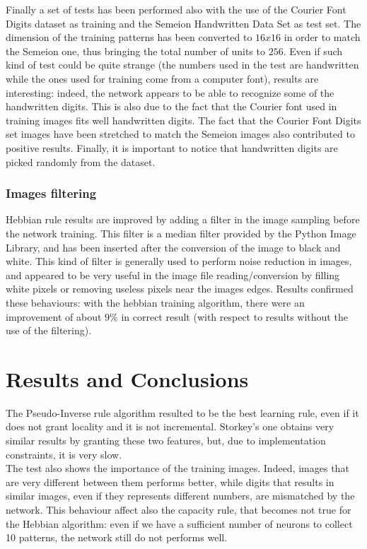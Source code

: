 \documentclass[letterpaper,twocolumn,10pt]{article}
\begin{document}
Finally a set of tests has been performed also with the use of the Courier Font Digits dataset as training and the Semeion Handwritten Data Set as test set. The dimension of the training patterns has been converted to $16x16$ in order to match the Semeion one, thus bringing the total number of units to $256$. Even if such kind of test could be quite strange (the numbers used in the test are handwritten while the ones used for training come from a computer font), results are interesting: indeed, the network appears to be able to recognize some of the handwritten digits. This is also due to the fact that the Courier font used in training images fits well handwritten digits. The fact that the Courier Font Digits set images have been stretched to match the Semeion images also contributed to positive results. Finally, it is important to notice that handwritten digits are picked randomly from the dataset.\\

\subsubsection{Images filtering}
Hebbian rule results are improved by adding a filter in the image sampling before the network training. This filter is a median filter provided by the Python Image Library, and has been inserted after the conversion of the image to black and white. This kind of filter is generally used to perform noise reduction in images, and appeared to be very useful in the image file reading/conversion by filling white pixels or removing useless pixels near the images edges. Results confirmed these behaviours: with the hebbian training algorithm, there were an improvement of about $9\%$ in correct result (with respect to results without the use of the filtering).



\section{Results and Conclusions}
The Pseudo-Inverse rule algorithm resulted to be the best learning rule, even if it does not grant locality and it is not incremental. Storkey's one obtains very similar results by granting these two features, but, due to implementation constraints, it is very slow.\\
The test also shows the importance of the training images. Indeed, images that are very different between them performs better, while digits that results in similar images, even if they represents different numbers, are mismatched by the network. This behaviour affect also the capacity rule, that becomes not true for the Hebbian algorithm: even if we have a sufficient number of neurons to collect 10 patterns, the network still do not performs well.
\end{document}
